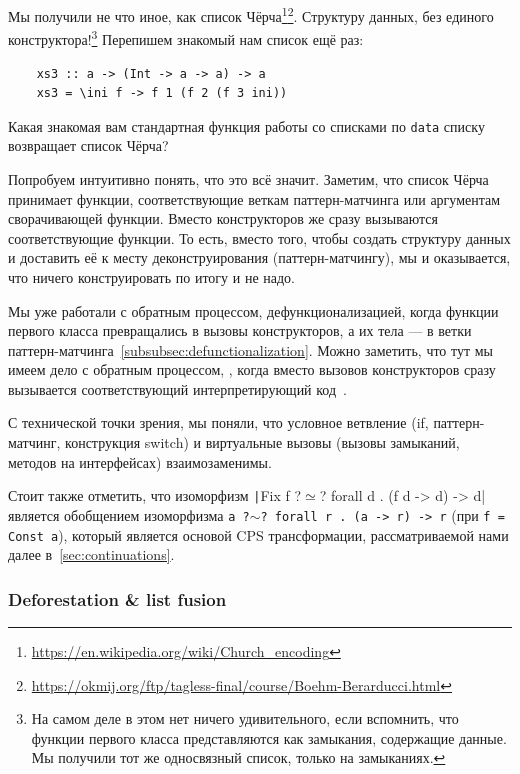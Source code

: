Мы получили не что иное, как список Чёрча\footnote{\url{https://en.wikipedia.org/wiki/Church_encoding}}\footnote{\url{https://okmij.org/ftp/tagless-final/course/Boehm-Berarducci.html}}.
Структуру данных, без единого конструктора!\footnote{На самом деле в этом нет ничего удивительного, если вспомнить, что функции первого класса представляются как замыкания, содержащие данные. Мы получили тот же односвязный список, только на замыканиях.}
Перепишем знакомый нам список ещё раз:
\begin{verbatim}
    xs3 :: a -> (Int -> a -> a) -> a
    xs3 = \ini f -> f 1 (f 2 (f 3 ini))
\end{verbatim}

\begin{task}
    Какая знакомая вам стандартная функция работы со списками по \texttt{data} списку возвращает список Чёрча?
\end{task}

Попробуем интуитивно понять, что это всё значит.
Заметим, что список Чёрча принимает функции, соответствующие веткам паттерн-матчинга или аргументам сворачивающей функции.
Вместо конструкторов же сразу вызываются соответствующие функции.
То есть, вместо того, чтобы создать структуру данных и доставить её к месту деконструирования (паттерн-матчингу), мы  и оказывается, что ничего конструировать по итогу и не надо.

Мы уже работали с обратным процессом, дефункционализацией, когда функции первого класса превращались в вызовы конструкторов, а их тела --- в ветки паттерн-матчинга~\ref{subsubsec:defunctionalization}.
Можно заметить, что тут мы имеем дело с обратным процессом, , когда вместо вызовов конструкторов сразу вызывается соответствующий интерпретирующий код~\cite{DANVY2009534}.

С технической точки зрения, мы поняли, что условное ветвление (if, паттерн-матчинг, конструкция switch) и виртуальные вызовы (вызовы замыканий, методов на интерфейсах) взаимозаменимы.

Стоит также отметить, что изоморфизм \texttt|Fix f ?$\simeq$? forall d . (f d -> d) -> d| является обобщением изоморфизма \texttt{a ?$\sim$? forall r . (a -> r) -> r} (при \texttt{f = Const a}), который является основой CPS трансформации, рассматриваемой нами далее в~\ref{sec:continuations}.

\subsubsection{Deforestation \& list fusion} \label{subsubsec:deforestation-fusion}

